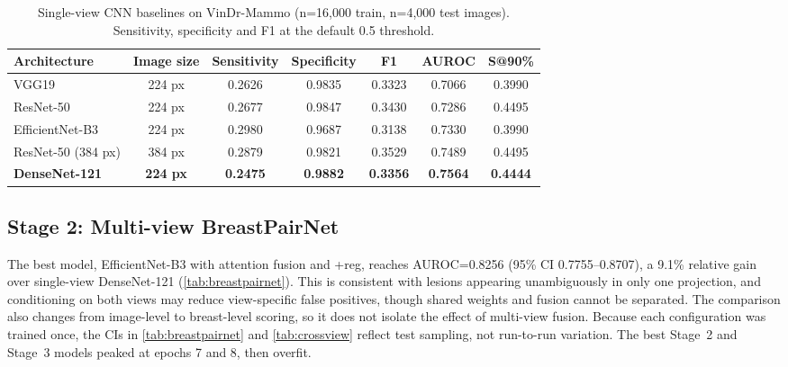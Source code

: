 \documentclass[conference]{IEEEtran}
\newcommand{\vindr}{VinDr-Mammo}
\begin{document}
\begin{table}[!t]
\centering
\caption{Single-view CNN baselines on \vindr{} (n=16,000 train, n=4,000 test images). Sensitivity, specificity and F1 at the default 0.5 threshold.}
\label{tab:single-view}
{\scriptsize\setlength{\tabcolsep}{2.5pt}%
\begin{tabular}{|>{\raggedright\arraybackslash}p{1.75cm}|c|c|c|c|c|c|}
\hline
\textbf{Architecture} & \textbf{Image size} & \textbf{Sensitivity} & \textbf{Specificity} & \textbf{F1} & \textbf{AUROC} & \textbf{S@90\%} \\
\hline
VGG19 & 224 px & 0.2626 & 0.9835 & 0.3323 & 0.7066 & 0.3990 \\
\hline
ResNet-50 & 224 px & 0.2677 & 0.9847 & 0.3430 & 0.7286 & 0.4495 \\
\hline
EfficientNet-B3 & 224 px & 0.2980 & 0.9687 & 0.3138 & 0.7330 & 0.3990 \\
\hline
ResNet-50 (384 px) & 384 px & 0.2879 & 0.9821 & 0.3529 & 0.7489 & 0.4495 \\
\hline
\textbf{DenseNet-121} & \textbf{224 px} & \textbf{0.2475} & \textbf{0.9882} & \textbf{0.3356} & \textbf{0.7564} & \textbf{0.4444} \\
\hline
\end{tabular}}
\end{table}

\subsection{Stage 2: Multi-view BreastPairNet}

The best model, EfficientNet-B3 with attention fusion and +reg, reaches AUROC=0.8256 (95\% CI 0.7755--0.8707), a 9.1\% relative gain over single-view DenseNet-121 (\autoref{tab:breastpairnet}). This is consistent with lesions appearing unambiguously in only one projection, and conditioning on both views may reduce view-specific false positives, though shared weights and fusion cannot be separated. The comparison also changes from image-level to breast-level scoring, so it does not isolate the effect of multi-view fusion. Because each configuration was trained once, the CIs in \autoref{tab:breastpairnet} and \autoref{tab:crossview} reflect test sampling, not run-to-run variation. The best Stage~2 and Stage~3 models peaked at epochs 7 and 8, then overfit.
\end{document}

